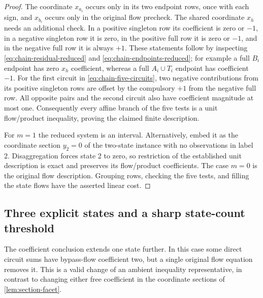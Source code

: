 \begin{proof}
The coordinate $x_{a_i}$ occurs only in its two endpoint rows,
once with each sign, and $x_{b_i}$ occurs only in the original
flow precheck. The shared coordinate $x_h$ needs an additional
check. In a positive singleton row its coefficient is zero or
$-1$, in a negative singleton row it is zero, in the positive
full row it is zero or $-1$, and in the negative full row it is
always $+1$. These statements follow by inspecting
\eqref{eq:chain-residual-reduced} and
\eqref{eq:chain-endpoints-reduced}; for example a full $B_i$
endpoint has zero $x_h$ coefficient, whereas a full $A_i\cup T_i$
endpoint has coefficient $-1$.
For the first circuit in \eqref{eq:chain-five-circuits}, two
negative contributions from its positive singleton rows are offset by the compulsory
$+1$ from the negative full row. All opposite pairs and the
second circuit also have coefficient magnitude at most one.
Consequently every affine branch of the five tests is a unit
flow/product inequality, proving the claimed finite description.

For $m=1$ the reduced system is an interval. Alternatively, embed
it as the coordinate section $y_2=0$ of the two-state instance
with no observations in label 2. Disaggregation forces state 2
to zero, so restriction of the established unit description is
exact and preserves its flow/product coefficients. The case $m=0$
is the original flow description. Grouping rows, checking the five
tests, and filling the state flows have the asserted linear cost.
\end{proof}

\subsection{Three explicit states and a sharp state-count threshold}

The coefficient conclusion extends one state further. In this case
some direct circuit sums have bypass-flow coefficient two, but a
single original flow equation removes it. This is a valid change of
an ambient inequality representative, in contrast to changing either
free coefficient in the coordinate sections of
\cref{lem:section-facet}.

